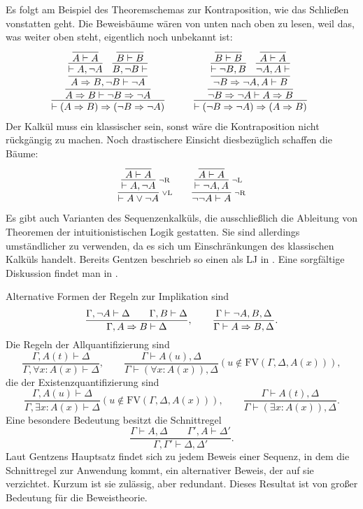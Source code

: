 Es folgt am Beispiel des Theoremschemas zur Kontraposition, wie das
Schließen vonstatten geht. Die Beweisbäume wären von unten nach oben
zu lesen, weil das, was weiter oben steht, eigentlich noch unbekannt ist:
\[
\begin{array}{@{}l@{\qquad\quad}l}
\infer{\vdash (A\cond B)\cond (\lnot B\cond\lnot A)}{
  \infer{A\cond B\vdash\lnot B\cond\lnot A}{
    \infer{A\cond B, \lnot B\vdash\lnot A}{
      \infer{\vdash A, \lnot A}{
        \infer{A\vdash A}{}}
    & \infer{B, \lnot B\vdash}{
        \infer{B\vdash B}{}}}}}
&
\infer{\vdash (\lnot B\cond\lnot A)\cond (A\cond B)}{
  \infer{\lnot B\cond\lnot A\vdash A\cond B}{
    \infer{\lnot B\cond\lnot A, A\vdash B}{
      \infer{\vdash \lnot B, B}{
        \infer{B\vdash B}{}}
    & \infer{\lnot A, A\vdash}{
        \infer{A\vdash A}{}}}}}
\end{array}
\]
Der Kalkül muss ein klassischer sein, sonst wäre die Kontraposition
nicht rückgängig zu machen. Noch drastischere Einsicht diesbezüglich
schaffen die Bäume:
\[
\begin{array}{l@{\qquad}l}
\infer[\infernote{$\lor$L}]{\vdash A\lor\lnot A}{
  \infer[\infernote{$\lnot$R}]{\vdash A,\lnot A}{
    \infer{A\vdash A}{}}}
&
\infer[\infernote{$\lnot$R}]{\lnot\lnot A\vdash A}{
  \infer[\infernote{$\lnot$L}]{\vdash\lnot A, A}{
    \infer{A\vdash A}{}}}
\end{array}
\]
Es gibt auch Varianten des Sequenzenkalküls, die ausschließlich die
Ableitung von Theoremen der intuitionistischen Logik gestatten. Sie sind
allerdings umständlicher zu verwenden, da es sich um Einschränkungen des
klassischen Kalküls handelt. Bereits Gentzen beschrieb so einen
als LJ in \cite{Gentzen1935}. Eine sorgfältige Diskussion findet man
in \cite{Mimram}.

Alternative Formen der Regeln zur Implikation sind
\[\dfrac{\Gamma,\lnot A\vdash\Delta\qquad\Gamma, B\vdash\Delta}
{\Gamma, A\Rightarrow B\vdash\Delta},\qquad
\dfrac{\Gamma\vdash \lnot A, B,\Delta}{\Gamma\vdash A\Rightarrow B,\Delta}.\]
Die Regeln der Allquantifizierung sind
\[\dfrac{\Gamma, A(t)\vdash\Delta}{\Gamma,\forall x\colon A(x)\vdash\Delta},\qquad
\dfrac{\Gamma\vdash A(u),\Delta}{\Gamma\vdash (\forall x\colon A(x)),\Delta}
(u\notin\mathrm{FV}(\Gamma,\Delta,A(x))),\]
die der Existenzquantifizierung sind
\[\dfrac{\Gamma, A(u)\vdash\Delta}{\Gamma,\exists x\colon A(x)\vdash\Delta}
(u\notin\mathrm{FV}(\Gamma,\Delta,A(x))),\qquad
\dfrac{\Gamma\vdash A(t),\Delta}{\Gamma\vdash (\exists x\colon A(x)),\Delta}.\]
Eine besondere Bedeutung besitzt die Schnittregel
\[\dfrac{\Gamma\vdash A,\Delta\qquad\Gamma',A\vdash\Delta'}
{\Gamma,\Gamma'\vdash\Delta,\Delta'}.\]
Laut Gentzens Hauptsatz findet sich zu jedem Beweis einer Sequenz,
in dem die Schnittregel zur Anwendung kommt, ein alternativer Beweis,
der auf sie verzichtet. Kurzum ist sie zulässig, aber redundant. Dieses
Resultat ist von großer Bedeutung für die Beweistheorie.

